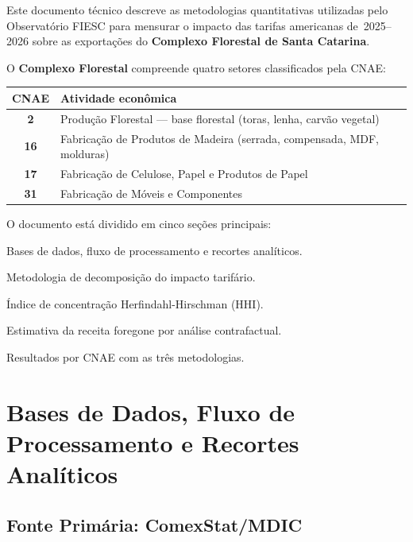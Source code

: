 \documentclass[12pt, a4paper]{article}
\begin{document}
Este documento técnico descreve as metodologias quantitativas utilizadas
pelo Observatório FIESC para mensurar o impacto das tarifas americanas
de~2025--2026 sobre as exportações do \textbf{Complexo Florestal de
Santa Catarina}.

O \textbf{Complexo Florestal} compreende quatro setores classificados pela CNAE:

\begin{center}
\renewcommand{\arraystretch}{1.3}
\begin{tabular}{>{\bfseries}cl}
\toprule
CNAE & Atividade econômica \\
\midrule
2  & Produção Florestal --- base florestal (toras, lenha, carvão vegetal) \\
16 & Fabricação de Produtos de Madeira (serrada, compensada, MDF, molduras) \\
17 & Fabricação de Celulose, Papel e Produtos de Papel \\
31 & Fabricação de Móveis e Componentes \\
\bottomrule
\end{tabular}
\end{center}

\noindent O documento está dividido em cinco seções principais:

\begin{description}[style=nextline, leftmargin=2cm]
  \item[Seção~\ref{sec:bases}]
    Bases de dados, fluxo de processamento e recortes analíticos.
  \item[Seção~\ref{sec:decomp}]
    Metodologia de decomposição do impacto tarifário.
  \item[Seção~\ref{sec:hhi}]
    Índice de concentração Herfindahl-Hirschman (HHI).
  \item[Seção~\ref{sec:receita}]
    Estimativa da receita foregone por análise contrafactual.
  \item[Seção~\ref{sec:resultados}]
    Resultados por CNAE com as três metodologias.
\end{description}

\section{Bases de Dados, Fluxo de Processamento e Recortes Analíticos}
\label{sec:bases}

\subsection{Fonte Primária: ComexStat/MDIC}
\end{document}
